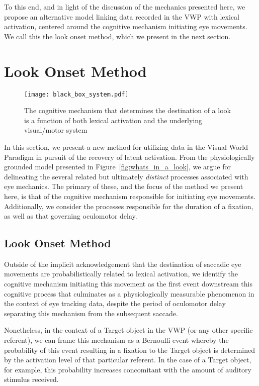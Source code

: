 To this end, and in light of the discussion of the mechanics presented here, we propose an alternative model linking data recorded in the VWP with lexical activation, centered around the cognitive mechanism initiating eye movements. We call this the look onset method, which we present in the next section.




\section{Look Onset Method}

\begin{figure}[H]
\centering
\texttt{[image: black\_box\_system.pdf]}
\caption{The cognitive mechanism that determines the destination of a look is a function of both lexical activation and the underlying visual/motor system}
\label{fig:black_box_model}
\end{figure}


In this section, we present a new method for utilizing data in the Visual World Paradigm in pursuit of the recovery of latent activation. From the physiologically grounded model presented in Figure~\ref{fig:whats_in_a_look}, we argue for delineating the several related but ultimately \emph{distinct} processes associated with eye mechanics. The primary of these, and the focus of the method we present here, is that of the cognitive mechanism responsible for initiating eye movements. Additionally, we consider the processes responsible for the duration of a fixation, as well as that governing oculomotor delay.

\subsection{Look Onset Method}

Outside of the implicit acknowledgement that the destination of saccadic eye movements are probabilistically related to lexical activation, we identify the cognitive mechanism initiating this movement as the first event downstream this cognitive process that culminates as a physiologically measurable phenomenon in the context of eye tracking data, despite the period of oculomotor delay separating this mechanism from the subsequent saccade. 

Nonetheless, in the context of a Target object in the VWP (or any other specific referent), we can frame this mechanism as a Bernoulli event whereby the probability of this event resulting in a fixation to the Target object is determined by the activation level of that particular referent. In the case of a Target object, for example, this probability increases concomitant with the amount of auditory stimulus received.

